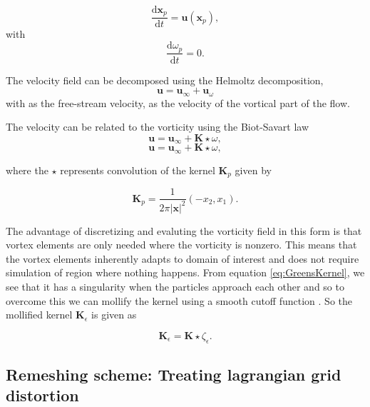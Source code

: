 \begin{equation}
\frac{\mathrm{d}\mathbf{x}_p}{\mathrm{d}t} = \mathbf{u}\left(\mathbf{x}_p\right),
\end{equation}
with
\begin{equation}
\frac{\mathrm{d}\omega_p}{\mathrm{d}t} = 0.
\end{equation}

The velocity field can be decomposed using the Helmoltz decomposition,
\begin{equation}
\mathbf{u} = \mathbf{u}_{\infty} + \mathbf{u}_{\omega}
\end{equation}
with  as the free-stream velocity,  as the velocity of the vortical part of the flow.


The velocity can be related to the vorticity using the Biot-Savart law
\begin{equation}
\mathbf{u} = \mathbf{u}_{\infty} + \mathbf{K}\star\omega,
\end{equation}
\begin{equation}
\mathbf{u} = \mathbf{u}_{\infty} + \mathbf{K}\star\omega,
\end{equation}

where the $\star$ represents convolution of the kernel $\mathbf{K}_p$ given by

\begin{equation}
\mathbf{K}_p = \frac{1}{2\pi\left|\mathbf{x}\right|^2}\left(-x_2,x_1\right).
\label{eq:GreensKernel}
\end{equation}

The advantage of discretizing and evaluting the vorticity field in this form is that vortex elements are only needed where the vorticity is nonzero. This means that the vortex elements inherently adapts to domain of interest and does not require simulation of region where nothing happens. From equation \ref{eq:GreensKernel}, we see that it has a singularity when the particles approach each other and so to overcome this we can mollify the kernel using a smooth cutoff function . So the mollified kernel $\mathbf{K}_{\epsilon}$ is given as 

\begin{equation}
\mathbf{K}_{\epsilon} = \mathbf{K} \star \zeta_{\epsilon}.
\end{equation}

\subsection{Remeshing scheme: Treating lagrangian grid distortion}

